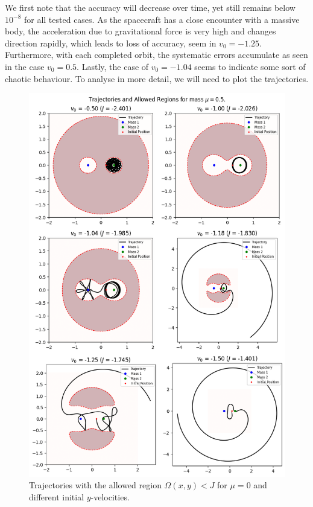 \documentclass{article}
\begin{document}
We first note that the accuracy will decrease over time, yet still remains below \(10^{-8}\) for all tested cases. As the spacecraft has a close encounter with a massive body, the acceleration due to gravitational force is very high and changes direction rapidly, which leads to loss of accuracy, seem in \(v_0 = -1.25\). Furthermore, with each completed orbit, the systematic errors accumulate as seen in the case \(v_0 = 0.5\). Lastly, the case of \(v_0 = -1.04\) seems to indicate some sort of chaotic behaviour. To analyse in more detail, we will need to plot the trajectories.

\begin{figure}
    \centering
    \includegraphics[width=0.95\linewidth]{images/spacetravel.png}
    \caption{Trajectories with the allowed region \(\Omega(x, y) < J\) for \(\mu = 0\) and different initial \(y\)-velocities.}
\end{figure}
\end{document}

